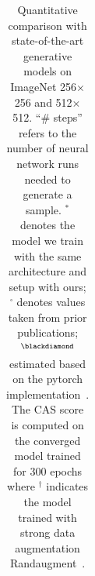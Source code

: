 \begin{table}[h]
{\begin{tabular}{lc ccc ccc ccc cc}
    \end{tabular}
    }
    \vspace{-5pt}
    \caption{Quantitative comparison with state-of-the-art generative models on ImageNet 256$\times$256 and 512$\times$512. 
    \footnotesize{``\# steps” refers to the number of neural network runs needed to generate a sample.  $^\ast$ denotes the model we train with the same architecture and setup with ours; $^\square$ denotes values taken from prior publications; $^\blackdiamond$ estimated based on the pytorch implementation~\cite{pytorch2020vqvae2}. The CAS score is computed on the converged model trained for 300 epochs where $^\dagger$ indicates the model trained with strong data augmentation Randaugment~\cite{cubuk2020randaugment}.} 
    }
    \label{tab:maintable}

\end{table}